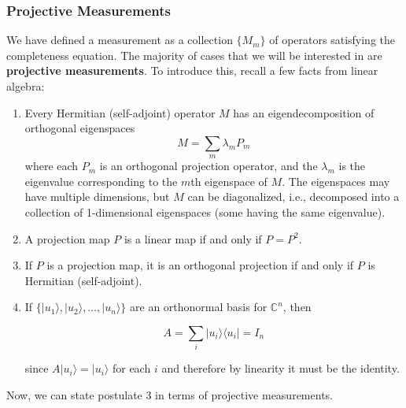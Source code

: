 \documentclass{article}
\theoremstyle{definition}
\begin{document}
    \subsubsection{Projective Measurements}

      We have defined a measurement as a collection $\{ M_m\}$ of operators satisfying the completeness equation. The majority of cases that we will be interested in are \textbf{projective measurements}. To introduce this, recall a few facts from linear algebra:
      \begin{enumerate}
        \item Every Hermitian (self-adjoint) operator $M$ has an eigendecomposition of orthogonal eigenspaces
          \[M = \sum_m \lambda_m P_m\]
        where each $P_m$ is an orthogonal projection operator, and the $\lambda_m$ is the eigenvalue corresponding to the $m$th eigenspace of $M$. The eigenspaces may have multiple dimensions, but $M$ can be diagonalized, i.e., decomposed into a collection of 1-dimensional eigenspaces (some having the same eigenvalue).

        \item A projection map $P$ is a linear map if and only if $P = P^2$.

        \item If $P$ is a projection map, it is an orthogonal projection if and only if $P$ is Hermitian (self-adjoint).

        \item If $\{ |u_1 \rangle, |u_2 \rangle, \ldots, |u_n \rangle \}$ are an orthonormal basis for $\mathbb{C}^n$, then

          \[A = \sum_i |u_i \rangle \langle u_i | = I_n\]

        since $A |u_i \rangle = |u_i \rangle$ for each $i$ and therefore by linearity it must be the identity.
      \end{enumerate}

      Now, we can state postulate 3 in terms of projective measurements. 
\end{document}
